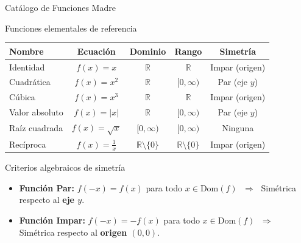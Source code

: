 \documentclass[aspectratio=169]{beamer}
\begin{document}
\begin{frame}{Catálogo de Funciones Madre}
  \begin{block}{Funciones elementales de referencia}
    \begin{center}
      \small
      \begin{tabular}{lcccc}
        \toprule
        \textbf{Nombre} & \textbf{Ecuación} & \textbf{Dominio} & \textbf{Rango} & \textbf{Simetría} \\
        \midrule
        Identidad & $f(x) = x$ & $\mathbb{R}$ & $\mathbb{R}$ & Impar (origen) \\
        Cuadrática & $f(x) = x^2$ & $\mathbb{R}$ & $[0, \infty)$ & Par (eje $y$) \\
        Cúbica & $f(x) = x^3$ & $\mathbb{R}$ & $\mathbb{R}$ & Impar (origen) \\
        Valor absoluto & $f(x) = |x|$ & $\mathbb{R}$ & $[0, \infty)$ & Par (eje $y$) \\
        Raíz cuadrada & $f(x) = \sqrt{x}$ & $[0, \infty)$ & $[0, \infty)$ & Ninguna \\
        Recíproca & $f(x) = \frac{1}{x}$ & $\mathbb{R} \setminus \{0\}$ & $\mathbb{R} \setminus \{0\}$ & Impar (origen) \\
        \bottomrule
      \end{tabular}
    \end{center}
  \end{block}

  \vspace{4pt}
  \begin{block}{Criterios algebraicos de simetría}
    \begin{itemize}
      \item \textbf{Función Par:} $f(-x) = f(x)$ para todo $x \in \text{Dom}(f)$ $\;\Longrightarrow\;$ Simétrica respecto al \textbf{eje $y$}.
      \item \textbf{Función Impar:} $f(-x) = -f(x)$ para todo $x \in \text{Dom}(f)$ $\;\Longrightarrow\;$ Simétrica respecto al \textbf{origen $(0,0)$}.
    \end{itemize}
  \end{block}
\end{frame}
\end{document}
